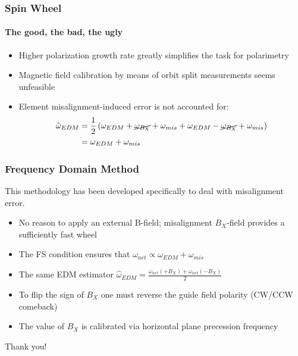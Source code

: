 \documentclass{beamer}
\newcommand{\w}{\omega}
\begin{document}
\begin{frame}\frametitle{Spin Wheel}\framesubtitle{The good, the bad, the ugly}
  \begin{itemize}
  \item Higher polarization growth rate greatly simplifies the task for polarimetry
  \item Magnetic field calibration by means of orbit split measurements seems unfeasible
  \item Element misalignment-induced error is not accounted for:
    \begin{align*}
      \hat\w_{EDM} &= \frac12\left(\w_{EDM} + \cancel{\w_{B_X}} + \w_{mis} + \w_{EDM} - \cancel{\w_{B_X}} + \w_{mis} \right) \\
      &= \w_{EDM} + \w_{mis}
    \end{align*}
  \end{itemize}
\end{frame}

\begin{frame}\frametitle{Frequency Domain Method}
  This methodology has been developed specifically to deal with misalignment error.
  \begin{itemize}
  \item No reason to apply an external B-field; misalignment $B_X$-field provides a sufficiently fast wheel
  \item The FS condition ensures that $\w_{net} \propto \w_{EDM} + \w_{mis}$
  \item The same EDM estimator $\hat\w_{EDM} = \frac{\w_{net}(+B_X) + \w_{net}(-B_X)}{2}$
  \item To flip the sign of $B_X$ one must reverse the guide field polarity (CW/CCW comeback)
  \item The value of $B_X$ is calibrated via horizontal plane precession frequency
  \end{itemize}
\end{frame}

\begin{frame}
  \begin{center}
    Thank you!
  \end{center}
\end{frame}
\end{document}
